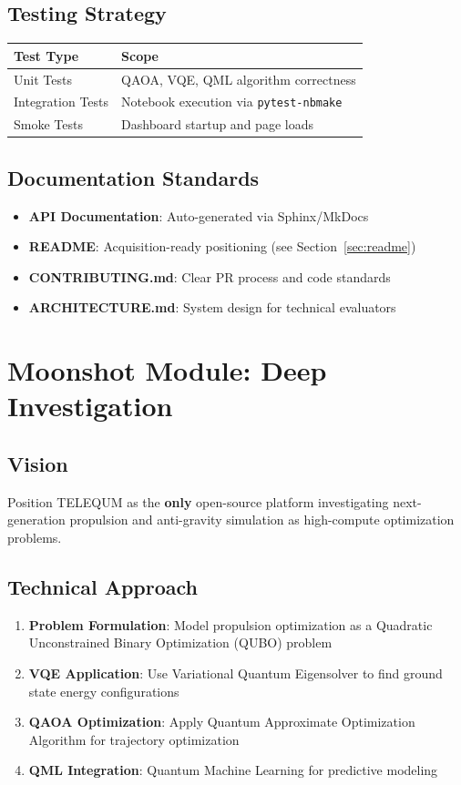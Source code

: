 \documentclass[11pt,a4paper]{article}
\begin{document}
\subsection{Testing Strategy}

\begin{tabular}{lp{8cm}}
\toprule
\textbf{Test Type} & \textbf{Scope} \\
\midrule
Unit Tests & QAOA, VQE, QML algorithm correctness \\
Integration Tests & Notebook execution via \texttt{pytest-nbmake} \\
Smoke Tests & Dashboard startup and page loads \\
\bottomrule
\end{tabular}

\subsection{Documentation Standards}

\begin{itemize}
    \item \textbf{API Documentation}: Auto-generated via Sphinx/MkDocs
    \item \textbf{README}: Acquisition-ready positioning (see Section~\ref{sec:readme})
    \item \textbf{CONTRIBUTING.md}: Clear PR process and code standards
    \item \textbf{ARCHITECTURE.md}: System design for technical evaluators
\end{itemize}

\section{Moonshot Module: Deep Investigation}

\subsection{Vision}
Position TELEQUM as the \textbf{only} open-source platform investigating next-generation propulsion and anti-gravity simulation as high-compute optimization problems.

\subsection{Technical Approach}
\begin{enumerate}
    \item \textbf{Problem Formulation}: Model propulsion optimization as a Quadratic Unconstrained Binary Optimization (QUBO) problem
    \item \textbf{VQE Application}: Use Variational Quantum Eigensolver to find ground state energy configurations
    \item \textbf{QAOA Optimization}: Apply Quantum Approximate Optimization Algorithm for trajectory optimization
    \item \textbf{QML Integration}: Quantum Machine Learning for predictive modeling
\end{enumerate}
\end{document}
